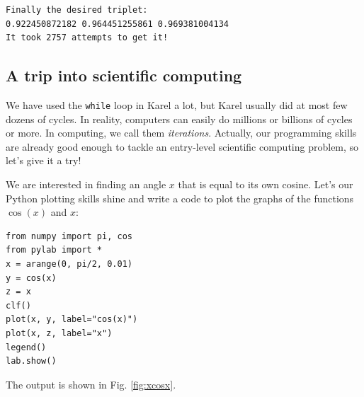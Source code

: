 \begin{verbatim}
Finally the desired triplet:
0.922450872182 0.964451255861 0.969381004134
It took 2757 attempts to get it!
\end{verbatim}

\subsection{A trip into scientific computing}

We have used the {\tt while} loop in Karel a lot,
but Karel usually did at most few dozens of cycles. In reality, computers can easily 
do millions or billions of cycles or more. In computing, we call them {\em iterations}.
Actually, our programming skills are already good enough to tackle an entry-level
scientific computing problem, so let's give it a try! 

We are interested in finding an angle $x$ that is equal
to its own cosine. Let's our Python plotting skills shine and write a code to plot the graphs of
the functions $\cos(x)$ and $x$:

\begin{verbatim}
from numpy import pi, cos
from pylab import *
x = arange(0, pi/2, 0.01)
y = cos(x)
z = x
clf()
plot(x, y, label="cos(x)")
plot(x, z, label="x")
legend()
lab.show()
\end{verbatim}
The output is shown in Fig. \ref{fig:xcosx}.

